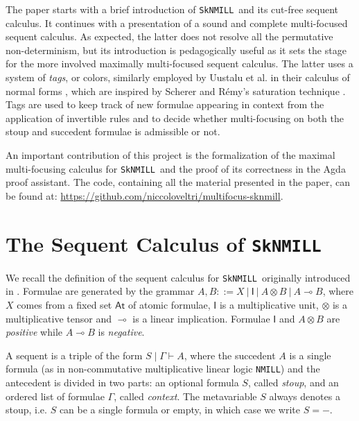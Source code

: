 \documentclass[runningheads]{llncs}
\newcommand{\ot}{\otimes}
\newcommand{\lolli}{\multimap}
\newcommand{\I}{\mathsf{I}}
\newcommand{\NMILL}{\texttt{NMILL}}
\newcommand{\SkNMILL}{\texttt{SkNMILL}}
\newcommand{\At}{\mathsf{At}}
\begin{document}
The paper starts with a brief introduction of \SkNMILL\ and its cut-free sequent calculus. It continues with a presentation of a sound and complete multi-focused sequent calculus. As expected, the latter does not resolve all the permutative non-determinism, but its introduction is pedagogically useful as it sets the stage for the more involved maximally multi-focused sequent calculus. The latter uses a system of \emph{tags}, or colors, similarly employed by Uustalu et al. in their calculus of normal forms \cite{UVW:protsn}, which are inspired by Scherer and R{\'e}my's saturation technique \cite{scherer:simple:2015}.
Tags are used to keep track of new formulae appearing in context from the application of invertible rules and to decide whether multi-focusing on both the stoup and succedent formulae is admissible or not.

An important contribution of this project is the formalization of the maximal multi-focusing calculus for \SkNMILL\ and the proof of its correctness in the Agda proof assistant. The code, containing all the material presented in the paper, can be found at: \url{https://github.com/niccoloveltri/multifocus-sknmill}. 


\section{The Sequent Calculus of \SkNMILL}\label{sec:seqcalc}

We recall the definition of the sequent calculus for \SkNMILL\ originally introduced in \cite{UVW:protsn}.
Formulae are generated by the grammar $A,B ::= X \ | \ \I \ | \ A \ot B \ | \ A \lolli B$, where $X$ comes from a fixed set $\At$ of atomic formulae, $\I$ is a multiplicative unit, $\ot$ is a multiplicative tensor and $\lolli$ is a linear implication. Formulae $\I$ and $A \ot B$ are \emph{positive} while $A \lolli B$ is \emph{negative}. 

A sequent is a triple of the form $S \mid \Gamma \vdash A$, where the succedent $A$ is a single formula (as in non-commutative multiplicative linear logic \NMILL) and the antecedent is divided in two parts: an optional formula $S$, called \emph{stoup}, and an ordered list of formulae $\Gamma$, called \emph{context}. 
The metavariable $S$ always denotes a stoup, i.e. $S$ can be a single formula or empty, in which case we write $S = -$.
\end{document}
